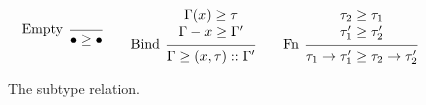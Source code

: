 \documentclass{article}
\theoremstyle{definition}
\newcommand*{\cons}{::}
\begin{document}
\begin{figure}[h!]
	\footnotesize
	\begin{flushright}
		\fbox{$\tau\ge\tau$}
	\end{flushright}
	\centering
	\vspace{0pt} %
	\[
		\begin{prooftree}
			\infer[left label=Empty]0{
			\bullet\ge\bullet
			}
		\end{prooftree}\qquad
		\begin{prooftree}
			\hypo{
				\begin{matrix}
					\Gamma(x)\ge\tau \\
					\Gamma-x\ge\Gamma'
				\end{matrix}
			}
			\infer[left label=Bind]1{
			\Gamma\ge(x,\tau)\cons\Gamma'
			}
		\end{prooftree}\qquad
		\begin{prooftree}
			\hypo{
				\begin{matrix}
					\tau_2\ge\tau_1 \\
					\tau_1'\ge\tau_2'
				\end{matrix}
			}
			\infer[left label=Fn]1{
			\tau_1\rightarrow\tau_1'\ge
			\tau_2\rightarrow\tau_2'
			}
		\end{prooftree}
	\]
	\caption{The subtype relation.}
	\label{fig:subtyping}
\end{figure}
\end{document}
